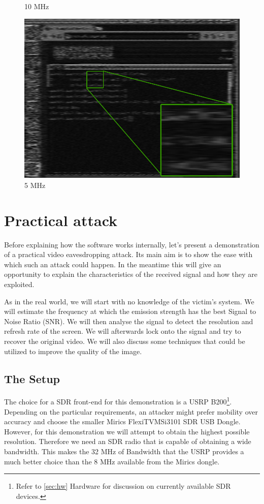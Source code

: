 \documentclass[a4paper,12pt,twoside,openright]{report}
\begin{document}
{{{{{\begin{figure}[h!]
  \caption{10 MHz}
\endminipage\hfill
{}
  \centering
    \includegraphics[width=\linewidth]{sr_5MHz_at_190MHz}
  \caption{5 MHz}
\endminipage
\end{figure}


\chapter{Practical attack} 

Before explaining how the software works internally, let's present a demonstration of a practical video eavesdropping attack. Its main aim is to show the ease with which such an attack could happen. In the meantime this will give an opportunity to explain the characteristics of the received signal and how they are exploited.

As in the real world, we will start with no knowledge of the victim's system. We will estimate the frequency at which the emission strength has the best Signal to Noise Ratio (SNR). We will then analyse the signal to detect the resolution and refresh rate of the screen. We will afterwards lock onto the signal and try to recover the original video. We will also discuss some techniques that could be utilized to improve the quality of the image.

\section{The Setup}

The choice for a SDR front-end for this demonstration is a USRP B200\footnote{Refer to \ref{sec:hw} Hardware for discussion on currently available SDR devices.}. Depending on the particular requirements, an attacker might prefer mobility over accuracy and choose the smaller Mirics FlexiTV\texttrademark MSi3101 SDR USB Dongle. However, for this demonstration we will attempt to obtain the highest possible resolution. Therefore we need an SDR radio that is capable of obtaining a wide bandwidth. This makes the 32 MHz of Bandwidth that the USRP provides a much better choice than the 8 MHz available from the Mirics dongle.

}}}}}
\end{document}
